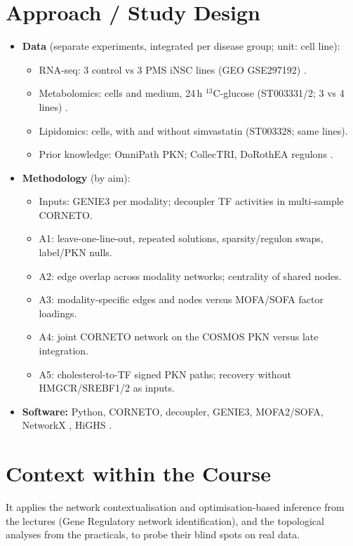 \documentclass[11pt, a4paper]{article}
\begin{document}
\section*{Approach / Study Design}
\begin{itemize}[noitemsep, topsep=2pt, parsep=0pt, leftmargin=*]
    \item \textbf{Data} (separate experiments, integrated per disease group; unit: cell line):
    \begin{itemize}[noitemsep, topsep=1pt, parsep=0pt]
        \item RNA-seq: 3 control vs 3 PMS iNSC lines (GEO GSE297192) \cite{park2025,barrett2013geo}.
        \item Metabolomics: cells and medium, 24\,h \(^{13}\)C-glucose (ST003331/2; 3 vs 4 lines) \cite{ionescu2024,sud2016mw}.
        \item Lipidomics: cells, with and without simvastatin (ST003328; same lines).
        \item Prior knowledge: OmniPath PKN; CollecTRI, DoRothEA regulons \cite{mullerdott2023collectri,garciaalonso2019dorothea}.
    \end{itemize}
   \item \textbf{Methodology} (by aim):
    \begin{itemize}[noitemsep, topsep=0pt]
        \item Inputs: GENIE3 per modality; decoupler TF activities \cite{badia2022decoupler} in multi-sample CORNETO.
        \item A1: leave-one-line-out, repeated solutions, sparsity/regulon swaps, label/PKN nulls.
        \item A2: edge overlap across modality networks; centrality of shared nodes.
        \item A3: modality-specific edges and nodes versus MOFA/SOFA factor loadings.
        \item A4: joint CORNETO network on the COSMOS PKN versus late integration.
        \item A5: cholesterol-to-TF signed PKN paths; recovery without HMGCR/SREBF1/2 as inputs.
    \end{itemize}
    \item \textbf{Software:} Python, CORNETO, decoupler, GENIE3, MOFA2/SOFA, NetworkX \cite{hagberg2008networkx}, HiGHS \cite{huangfu2018highs} \cite{shannon2003cytoscape}.
\end{itemize}

\section*{Context within the Course}
It applies the network contextualisation and optimisation-based inference from the lectures (Gene Regulatory network identification), and the topological analyses from the practicals, to probe their blind spots on real data.
\end{document}
